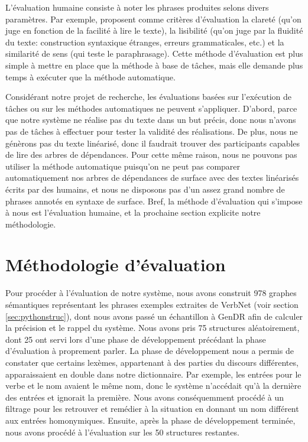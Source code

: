 L'évaluation humaine consiste à noter les phrases produites selons divers paramètres. Par exemple, \cite{BelzFirstSurfaceRealisation2011} proposent comme critères d'évaluation la clareté (qu'on juge en fonction de la facilité à lire le texte), la lisibilité (qu'on juge par la fluidité du texte: construction syntaxique étranges, erreurs grammaticales, etc.) et la similarité de sens (qui teste le paraphrasage). Cette méthode d'évaluation est plus simple à mettre en place que la méthode à base de tâches, mais elle demande plus temps à exécuter que la méthode automatique.
 
Considérant notre projet de recherche, les évaluations basées sur l'exécution de tâches ou sur les méthodes automatiques ne peuvent s'appliquer. D'abord, parce que notre système ne réalise pas du texte dans un but précis, donc nous n'avons pas de tâches à effectuer pour tester la validité des réalisations. De plus, nous ne génèrons pas du texte linéarisé, donc il faudrait trouver des participants capables de lire des arbres de dépendances. Pour cette même raison, nous ne pouvons pas utiliser la méthode automatique puisqu'on ne peut pas comparer automatiquement nos arbres de dépendances de surface avec des textes linéarisés écrits par des humains, et nous ne disposons pas d'un assez grand nombre de phrases annotés en syntaxe de surface. Bref, la méthode d'évaluation qui s'impose à nous est l'évaluation humaine, et la prochaine section explicite notre méthodologie.


\section{Méthodologie d'évaluation}

Pour procéder à l'évaluation de notre système, nous avons construit 978 graphes sémantiques représentant les phrases exemples extraites de VerbNet (voir section \ref{sec:pythonstruc}), dont nous avons passé un échantillon à GenDR afin de calculer la précision et le rappel du système. Nous avons pris 75 structures aléatoirement, dont 25 ont servi lors d'une phase de développement précédant la phase d'évaluation à proprement parler. La phase de développement nous a permis de constater
que certains lexèmes, appartenant à des parties du discours différentes, apparaissaient en double dans notre dictionnaire. Par exemple, les entrées pour le verbe  et le nom  avaient le même nom, donc le système n'accédait qu'à la dernière des entrées et ignorait la première. Nous avons conséquemment procédé à un filtrage pour les retrouver et remédier à la situation en donnant un nom différent aux entrées homonymiques. Ensuite, après la phase de développement terminée, nous avons procédé à l'évaluation sur les 50 structures restantes.
                              
